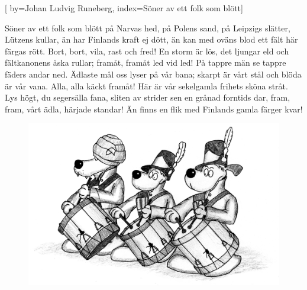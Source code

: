 

[
by={Johan Ludvig Runeberg},
index={Söner av ett folk som blött}]

\beginverse*
Söner av ett folk som blött
på Narvas hed, på Polens sand, på Leipzigs slätter, Lützens kullar,
än har Finlands kraft ej dött,
än kan med oväns blod ett fält här färgas rött.
Bort, bort, vila, rast och fred!
En storm är lös, det ljungar eld och fältkanonens åska rullar;
framåt, framåt led vid led!
På tappre män se tappre fäders andar ned.
Ädlaste mål
oss lyser på vår bana;
skarpt är vårt stål
och blöda är vår vana.
Alla, alla käckt framåt!
Här är vår sekelgamla frihets sköna stråt.
Lys högt, du segersälla fana,
sliten av strider sen en grånad forntids dar,
fram, fram, vårt ädla, härjade standar!
Än finns en flik med Finlands gamla färger kvar!
\endverse
\endsong

\begin{figure}
\begin{center}
\includegraphics[scale=.5]{../bilder/bjorneborgarnas_marsch.png} 
\end{center}
\end{figure}

